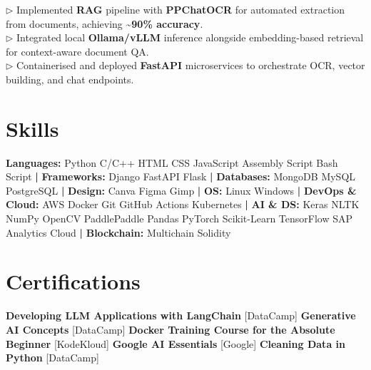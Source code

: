 \documentclass[]{resume-openfont}
\begin{document}
$\triangleright$ Implemented \textbf{RAG} pipeline with \textbf{PPChatOCR} for automated extraction from documents, achieving \textbf{\~{}90\% accuracy}.\\

$\triangleright$ Integrated local \textbf{Ollama/vLLM} inference alongside embedding-based retrieval for context-aware document QA.\\

$\triangleright$ Containerised and deployed \textbf{FastAPI} microservices to orchestrate OCR, vector building, and chat endpoints.\\

\noindent\hrulefill
\section{Skills}
\textbf{Languages:}{ Python \textbullet{} C/C++ \textbullet{} HTML \textbullet{} CSS  \textbullet{} JavaScript \textbullet{} Assembly Script \textbullet{} Bash Script} \textbf{|} \textbf{Frameworks:}{ Django \textbullet{} FastAPI \textbullet{} Flask} \textbf{|} \textbf{Databases:}{ MongoDB \textbullet{} MySQL \textbullet{} PostgreSQL} \textbf{|} \textbf{Design:}{ Canva \textbullet{} Figma \textbullet{} Gimp} \textbf{|} \textbf{OS:}{ Linux \textbullet{} Windows} \textbf{|} \textbf{DevOps \& Cloud:}{ AWS \textbullet{} Docker \textbullet{} Git \textbullet{} GitHub Actions \textbullet{} Kubernetes} \textbf{|} \textbf{AI \& DS:}{ Keras \textbullet{} NLTK \textbullet{} NumPy \textbullet{} OpenCV \textbullet{} PaddlePaddle \textbullet{} Pandas \textbullet{} PyTorch \textbullet{} Scikit-Learn \textbullet{} TensorFlow \textbullet{} SAP Analytics Cloud} \textbf{|} \textbf{Blockchain:}{ Multichain \textbullet{} Solidity}

\noindent\hrulefill
\section{Certifications}
\textbf{Developing LLM Applications with LangChain} [DataCamp] \textbullet{} \textbf{Generative AI Concepts} [DataCamp] \textbullet{} \textbf{Docker Training Course for the Absolute Beginner} [KodeKloud] \textbullet{} \textbf{Google AI Essentials} [Google] \textbullet{} \textbf{Cleaning Data in Python} [DataCamp]
\end{document}
